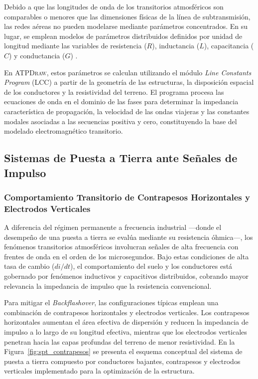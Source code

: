 \documentclass[12pt,letterpaper]{article}
\begin{document}
Debido a que las longitudes de onda de los transitorios atmosféricos son comparables o menores que las dimensiones físicas de la línea de subtransmisión, las redes aéreas no pueden modelarse mediante parámetros concentrados. En su lugar, se emplean modelos de parámetros distribuidos definidos por unidad de longitud mediante las variables de resistencia ($R$), inductancia ($L$), capacitancia ($C$) y conductancia ($G$) \cite{martinez2017power}.

En \textsc{ATPDraw}, estos parámetros se calculan utilizando el módulo \textit{Line Constants Program} (LCC) a partir de la geometría de las estructuras, la disposición espacial de los conductores y la resistividad del terreno. El programa procesa las ecuaciones de onda en el dominio de las fases para determinar la impedancia característica de propagación, la velocidad de las ondas viajeras y las constantes modales asociadas a las secuencias positiva y cero, constituyendo la base del modelado electromagnético transitorio.

\subsection{Sistemas de Puesta a Tierra ante Señales de Impulso}

\subsubsection{Comportamiento Transitorio de Contrapesos Horizontales y Electrodos Verticales}
A diferencia del régimen permanente a frecuencia industrial —donde el desempeño de una puesta a tierra se evalúa mediante su resistencia óhmica—, los fenómenos transitorios atmosféricos involucran señales de alta frecuencia con frentes de onda en el orden de los microsegundos. Bajo estas condiciones de alta tasa de cambio ($di/dt$), el comportamiento del suelo y los conductores está gobernado por fenómenos inductivos y capacitivos distribuidos, cobrando mayor relevancia la impedancia de impulso que la resistencia convencional.

Para mitigar el \textit{Backflashover}, las configuraciones típicas emplean una combinación de contrapesos horizontales y electrodos verticales. Los contrapesos horizontales aumentan el área efectiva de dispersión y reducen la impedancia de impulso a lo largo de su longitud efectiva, mientras que los electrodos verticales penetran hacia las capas profundas del terreno de menor resistividad. En la Figura~\ref{fig:spt_contrapesos} se presenta el esquema conceptual del sistema de puesta a tierra compuesto por conductores bajantes, contrapesos y electrodos verticales implementado para la optimización de la estructura.
\end{document}
